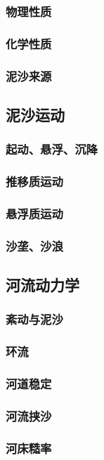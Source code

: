 \documentclass[UTF8]{../../ApplicationUniverse}
\begin{document}
        \subsubsection{物理性质}
        \subsubsection{化学性质}
        \subsubsection{泥沙来源}
    \subsection{泥沙运动}
        \subsubsection{起动、悬浮、沉降}
        \subsubsection{推移质运动}
        \subsubsection{悬浮质运动}
        \subsubsection{沙垄、沙浪}
    \subsection{河流动力学}
        \subsubsection{紊动与泥沙}
        \subsubsection{环流}
        \subsubsection{河道稳定}
        \subsubsection{河流挟沙}
        \subsubsection{河床糙率}
\end{document}
